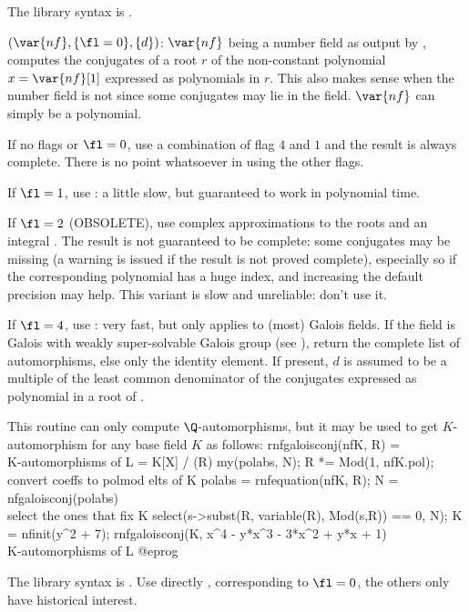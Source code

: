 The library syntax is .

$(\var{nf},\{\fl=0\},\{d\})$: \label{se:nfgaloisconj}$\var{nf}$ being a number field as output by , computes the
conjugates of a root $r$ of the non-constant polynomial $x=\var{nf}[1]$
expressed as polynomials in $r$. This also makes sense when the number field
is not  since some conjugates may lie in the field.
$\var{nf}$ can simply be a polynomial.

If no flags or $\fl=0$, use a combination of flag $4$ and $1$ and the result
is always complete. There is no point whatsoever in using the other flags.

If $\fl=1$, use : a little slow, but guaranteed to work in
polynomial time.

If $\fl=2$ (OBSOLETE), use complex approximations to the roots and an integral
. The result is not guaranteed to be complete: some
conjugates may be missing (a warning is issued if the result is not proved
complete), especially so if the corresponding polynomial has a huge index,
and increasing the default precision may help. This variant is slow and
unreliable: don't use it.

If $\fl=4$, use : very fast, but only applies to (most) Galois
fields. If the field is Galois with weakly
super-solvable Galois group (see ), return the complete list
of automorphisms, else only the identity element. If present, $d$ is assumed to
be a multiple of the least common denominator of the conjugates expressed as
polynomial in a root of .

This routine can only compute $\Q$-automorphisms, but it may be used to get
$K$-automorphism for any base field $K$ as follows:
\bprog
rnfgaloisconj(nfK, R) = \\ K-automorphisms of L = K[X] / (R)
{ my(polabs, N);
  R *= Mod(1, nfK.pol);             \\ convert coeffs to polmod elts of K
  polabs = rnfequation(nfK, R);
  N = nfgaloisconj(polabs) %
  \\ select the ones that fix K
  select(s->subst(R, variable(R), Mod(s,R)) == 0, N);
}
K  = nfinit(y^2 + 7);
rnfgaloisconj(K, x^4 - y*x^3 - 3*x^2 + y*x + 1)  \\ K-automorphisms of L
@eprog

The library syntax is .
Use directly
, corresponding to $\fl = 0$, the others
only have historical interest.

